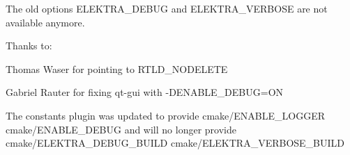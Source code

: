 The old options {\ttfamily E\+L\+E\+K\+T\+R\+A\+\_\+\+D\+E\+B\+UG} and {\ttfamily E\+L\+E\+K\+T\+R\+A\+\_\+\+V\+E\+R\+B\+O\+SE} are not available anymore.

Thanks to\+:


\begin{DoxyItemize}
\item Thomas Waser for pointing to {\ttfamily R\+T\+L\+D\+\_\+\+N\+O\+D\+E\+L\+E\+TE}
\item Gabriel Rauter for fixing qt-\/gui with {\ttfamily -\/\+D\+E\+N\+A\+B\+L\+E\+\_\+\+D\+E\+B\+UG=ON}
\end{DoxyItemize}

The constants plugin was updated to provide {\ttfamily cmake/\+E\+N\+A\+B\+L\+E\+\_\+\+L\+O\+G\+G\+ER} {\ttfamily cmake/\+E\+N\+A\+B\+L\+E\+\_\+\+D\+E\+B\+UG} and will no longer provide {\ttfamily cmake/\+E\+L\+E\+K\+T\+R\+A\+\_\+\+D\+E\+B\+U\+G\+\_\+\+B\+U\+I\+LD} {\ttfamily cmake/\+E\+L\+E\+K\+T\+R\+A\+\_\+\+V\+E\+R\+B\+O\+S\+E\+\_\+\+B\+U\+I\+LD}


